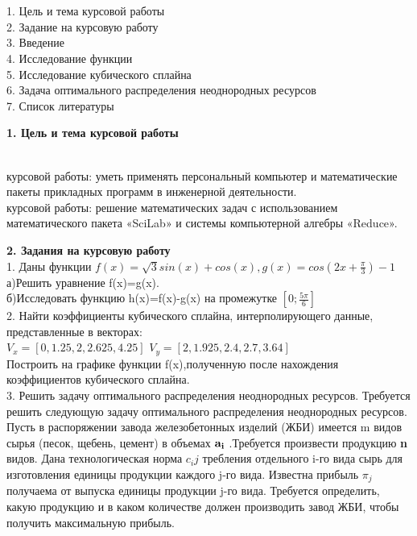 \documentclass[russian,utf8,nocolumnxxxi,nocolumnxxxii]{eskdtext}
\begin{document}
\\{}
\\1. Цель и тема курсовой работы
\\2. Задание на курсовую работу
\\3. Введение
\\4. Исследование функции
\\5. Исследование кубического сплайна
\\6. Задача оптимального распределения неоднородных ресурсов
\\7. Список литературы
\newpage

 {\large\bf 1. Цель и тема курсовой работы}

\\{ курсовой работы:} уметь применять персональный компьютер и математические пакеты прикладных программ в инженерной деятельности.
\\{ курсовой работы:} решение математических задач с использованием математического пакета «SciLab» и системы компьютерной алгебры «Reduce».

\newpage
{\large\bf2. Задания на курсовую работу}
\\1. Даны функции $f(x)=\sqrt{3}sin(x)+cos(x),g(x)=cos(2x+\frac{\pi}{3})-1$
\\а)Решить уравнение f(x)=g(x).
\\б)Исследовать функцию h(x)=f(x)-g(x) на промежутке $[0;\frac{5\pi}{6}]$
\\2. Найти коэффициенты кубического сплайна, интерполирующего данные, представленные в векторах:\\
$V_{x}=[0,1.25,2,2.625,4.25]$
$V_{y}=[2,1.925,2.4,2.7,3.64]$\\
Построить на графике функции f(x),полученную после нахождения коэффициентов кубического сплайна. \\
3. Решить задачу оптимального распределения неоднородных ресурсов.
Требуется решить следующую задачу оптимального распределения неоднородных ресурсов. Пусть в распоряжении завода железобетонных изделий (ЖБИ) имеется m видов сырья (песок, щебень, цемент) в объемах ${\bf a_i}$  .Требуется произвести продукцию {\bf n} видов. Дана технологическая норма $c_ij$  требления отдельного i-го вида сырь для изготовления единицы продукции каждого j-го вида. Известна прибыль $\pi_j$  получаема от выпуска единицы продукции j-го вида. Требуется определить, какую продукцию и в каком количестве должен производить завод ЖБИ, чтобы получить максимальную прибыль.

\begin{figure}[H]
\begin{center}
\begin{minipage}[h]{0.65\linewidth}
  \\
\end{minipage}
\end{center}
\end{figure}
\end{document}
